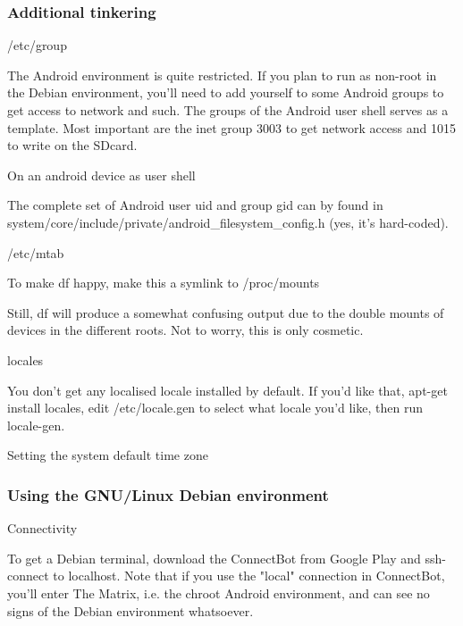 \subsubsection{Additional tinkering}

/etc/group

The Android environment is quite restricted. If you plan to run as non-root in
the Debian environment, you'll need to add yourself to some Android groups to
get access to network and such. The groups of the Android user shell serves as a
template. Most important are the inet group 3003 to get network access and 1015
to write on the SDcard.

On an android device as user shell


The complete set of Android user uid and group gid can by found in
system/core/include/private/android\_filesystem\_config.h (yes, it's
hard-coded).

/etc/mtab

To make df happy, make this a symlink to /proc/mounts


Still, df will produce a somewhat confusing output due to the double mounts of
devices in the different roots. Not to worry, this is only cosmetic.

locales

You don't get any localised locale installed by default. If you'd like that,
apt-get install locales, edit /etc/locale.gen to select what locale you'd like,
then run locale-gen.

Setting the system default time zone


\subsubsection{Using the GNU/Linux Debian environment}

Connectivity
 
To get a Debian terminal, download the ConnectBot from Google Play and
ssh-connect to localhost. Note that if you use the "local" connection in
ConnectBot, you'll enter The Matrix, i.e. the chroot Android environment, and
can see no signs of the Debian environment whatsoever.

